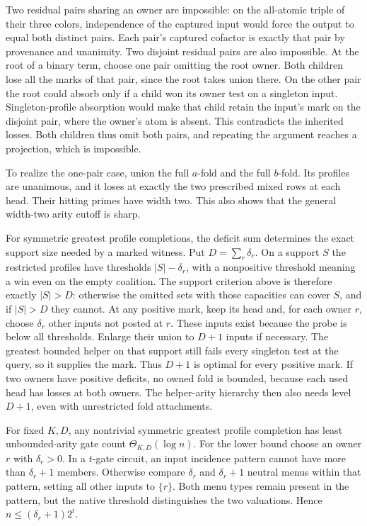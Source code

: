 Two residual pairs sharing an owner are impossible: on the
all-atomic triple of their three colors, independence of the
captured input would force the output to equal both distinct
pairs. Each pair's captured cofactor is exactly that pair
by provenance and unanimity. Two disjoint residual pairs
are also impossible. At the root of a binary term, choose
one pair omitting the root owner. Both children lose all
the marks of that pair, since the root takes union there.
On the other pair the root could absorb only if a child
won its owner test on a singleton input. Singleton-profile
absorption would make that child retain the input's mark
on the disjoint pair, where the owner's atom is absent.
This contradicts the inherited losses. Both children thus
omit both pairs, and repeating the argument reaches a
projection, which is impossible.

To realize the one-pair case, union the full $a$-fold and
the full $b$-fold. Its profiles are unanimous, and it loses
at exactly the two prescribed mixed rows at each head.
Their hitting primes have width two. This also shows that
the general width-two arity cutoff is sharp.

For symmetric greatest profile completions, the deficit sum
determines the exact support size needed by a marked witness.
Put $D=\sum_r\delta_r$. On a support $S$ the restricted
profiles have thresholds $|S|-\delta_r$, with a nonpositive
threshold meaning a win even on the empty coalition. The
support criterion above is therefore exactly $|S|>D$:
otherwise the omitted sets with those capacities can cover
$S$, and if $|S|>D$ they cannot. At any positive mark, keep
its head and, for each owner $r$, choose $\delta_r$ other
inputs not posted at $r$. These inputs exist because the
probe is below all thresholds. Enlarge their union to
$D+1$ inputs if necessary. The greatest bounded helper on
that support still fails every singleton test at the query,
so it supplies the mark. Thus $D+1$ is optimal for every
positive mark. If two owners have positive deficits, no
owned fold is bounded, because each used head has losses
at both owners. The helper-arity hierarchy then also needs
level $D+1$, even with unrestricted fold attachments.

For fixed $K,D$, any nontrivial symmetric greatest profile
completion has least unbounded-arity gate count
$\Theta_{K,D}(\log n)$. For the lower bound choose an owner
$r$ with $\delta_r>0$. In a $t$-gate circuit, an input
incidence pattern cannot have more than $\delta_r+1$ members.
Otherwise compare $\delta_r$ and $\delta_r+1$ neutral menus
within that pattern, setting all other inputs to $\{r\}$.
Both menu types remain present in the pattern, but the
native threshold distinguishes the two valuations. Hence
$n\le(\delta_r+1)2^t$.

